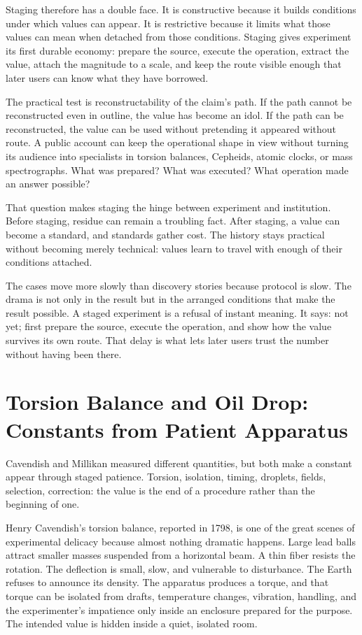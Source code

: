 \begin{chapteressay}
Staging therefore has a double face. It is constructive because it builds
conditions under which values can appear. It is restrictive because it
limits what those values can mean when detached from those conditions.
Staging gives experiment its first durable economy: prepare the source,
execute the operation, extract the value, attach the magnitude to a scale,
and keep the route visible enough that later users can know what they
have borrowed.

The practical test is reconstructability of the claim's path. If the path
cannot be reconstructed even in outline, the value has become an idol. If
the path can be reconstructed, the value can be used without pretending it
appeared without route. A public account can keep the operational shape in view without turning its
audience into specialists in torsion balances, Cepheids, atomic clocks, or
mass spectrographs. What was prepared? What was executed? What operation made an answer
possible?

That question makes staging the hinge between experiment and institution.
Before staging, residue can remain a troubling fact. After staging, a
value can become a standard, and standards gather cost. The history stays
practical without becoming merely technical: values learn to travel with
enough of their conditions attached.

The cases move more slowly than discovery stories because protocol is slow. The drama is not only in the result but in the arranged conditions
that make the result possible. A staged experiment is a refusal of instant
meaning. It says: not yet; first prepare the source, execute the
operation, and show how the value survives its own route. That delay is
what lets later users trust the number without having been there.
\end{chapteressay}

\section{Torsion Balance and Oil Drop: Constants from Patient Apparatus}

Cavendish and Millikan measured different quantities, but both make a
constant appear through staged patience. Torsion, isolation, timing,
droplets, fields, selection, correction: the value is the end of a procedure
rather than the beginning of one.

Henry Cavendish's torsion balance, reported in 1798, is one of the great
scenes of experimental delicacy because almost nothing dramatic happens.
Large lead balls attract smaller masses suspended from a horizontal beam. A
thin fiber resists the rotation. The deflection is small, slow, and
vulnerable to disturbance. The Earth refuses to announce its density. The
apparatus produces a torque, and that torque can be isolated from drafts,
temperature changes, vibration, handling, and the experimenter's impatience
only inside an enclosure prepared for the purpose. The intended value is
hidden inside a quiet, isolated room.

